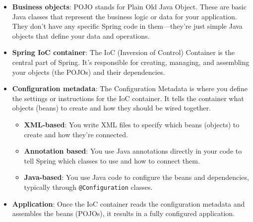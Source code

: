 \documentclass{article}
\begin{document}
\begin{itemize}
    \item \textbf{Business objects}: POJO stands for Plain Old Java Object. These are basic Java classes that represent the business logic or data for your application. They don’t have any specific Spring code in them—they’re just simple Java objects that define your data and operations.

    \item \textbf{Spring IoC container}: The IoC (Inversion of Control) Container is the central part of Spring. It’s responsible for creating, managing, and assembling your objects (the POJOs) and their dependencies.
    
    \item \textbf{Configuration metadata}: The Configuration Metadata is where you define the settings or instructions for the IoC container. It tells the container what objects (beans) to create and how they should be wired together.
    
    \begin{itemize}
        \item \textbf{XML-based}: You write XML files to specify which beans (objects) to create and how they’re connected.
        \item \textbf{Annotation based}: You use Java annotations directly in your code to tell Spring which classes to use and how to connect them.
        \item \textbf{Java-based}: You use Java code to configure the beans and dependencies, typically through \texttt{@Configuration} classes.
    \end{itemize}
    
    \item \textbf{Application}: Once the IoC container reads the configuration metadata and assembles the beans (POJOs), it results in a fully configured application.
\end{itemize}
\end{document}
